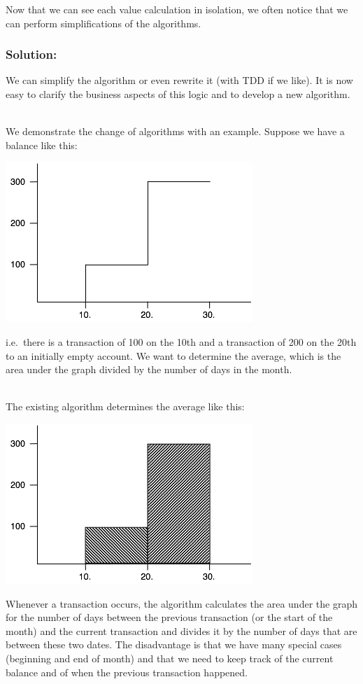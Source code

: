 \documentclass[a4paper,fleqn,titlepage,11pt]{article}
\begin{document}
Now that we can see each value calculation in isolation, we often notice that we can perform simplifications of the algorithms. 

\subsubsection*{Solution:}

We can simplify the algorithm or even rewrite it (with TDD if we like). It is now easy to clarify the business aspects of this logic and to develop a new algorithm. 
\\~

We demonstrate the change of algorithms with an example.
Suppose we have a balance like this:

\includegraphics[width=.5\textwidth]{balance.jpg}

i.e.~there is a transaction of 100 on the 10th and a transaction of 200 on the 20th to an initially empty account.
We want to determine the average, which is the area under the graph divided by the number of days in the month.
\\~

The existing algorithm determines the average like this:

\includegraphics[width=.5\textwidth]{initialAverage.jpg}

Whenever a transaction occurs, the algorithm calculates the area under the graph for the number of days between the previous transaction (or the start of the month) and the current transaction and divides it by the number of days that are between these two dates. The disadvantage is that we have many special cases (beginning and end of month) and that we need to keep track of the current balance and of when the previous transaction happened.
\\~
\end{document}
